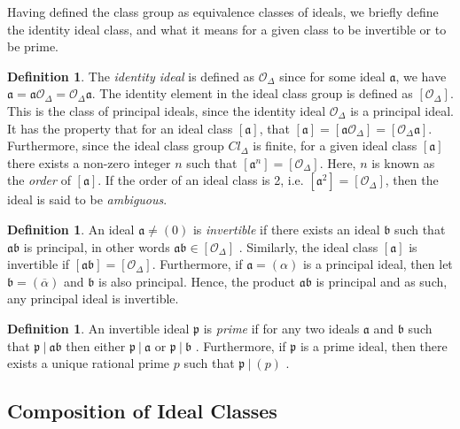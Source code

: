 \documentclass{ucalgthes1}
\theoremstyle{plain}
\theoremstyle{definition}
\newtheorem{defn}[thm]{Definition}
\newcommand{\OO}{\mathcal{O}}
\begin{document}
Having defined the class group as equivalence classes of ideals, we briefly define the identity ideal class, and what it means for a given class to be invertible or to be prime.

\begin{defn}
The \emph{identity ideal} is defined as $\OO_\Delta$ since for some ideal $\mathfrak a$, we have $\mathfrak a = \mathfrak a \OO_\Delta = \OO_\Delta \mathfrak a$.  The identity element in the ideal class group is defined as $[\OO_\Delta]$.  This is the class of principal ideals, since the identity ideal $\OO_\Delta$ is a principal ideal.  It has the property that for an ideal class $[\mathfrak a]$, that $[\mathfrak a] = [\mathfrak a \OO_\Delta] = [\OO_\Delta \mathfrak a]$. Furthermore, since the ideal class group $Cl_\Delta$ is finite, for a given ideal class $[\mathfrak a]$ there exists a non-zero integer $n$ such that $[{\mathfrak a}^n] = [\OO_\Delta]$.  Here, $n$ is known as the \emph{order} of $[\mathfrak a]$.  If the order of an ideal class is 2, i.e. $[\mathfrak a^2] = [\OO_\Delta]$, then the ideal is said to be \emph{ambiguous}.
\end{defn}


\begin{defn}
An ideal $\mathfrak a \neq (0)$ is \emph{invertible} if there exists an ideal $\mathfrak b$ such that $\mathfrak a \mathfrak b$ is principal, in other words $\mathfrak a \mathfrak b \in [\OO_\Delta]$ \cite[Definition 4.29]{Jac09}. Similarly, the ideal class $[\mathfrak a]$ is invertible if $[\mathfrak a \mathfrak b] = [\OO_\Delta]$.  Furthermore, if $\mathfrak a = (\alpha)$ is a principal ideal, then let $\mathfrak b = (\overline{\alpha})$ and $\mathfrak b$ is also principal.  Hence, the product $\mathfrak a \mathfrak b$ is principal and as such, any principal ideal is invertible.
\end{defn}

\begin{defn}
An invertible ideal $\mathfrak p$ is \emph{prime} if for any two ideals $\mathfrak a$ and $\mathfrak b$ such that $\mathfrak p ~|~ \mathfrak a \mathfrak b$ then either $\mathfrak p ~|~ \mathfrak a$ or $\mathfrak p ~|~ \mathfrak b$ \cite[Definition 4.40]{Jac09}.  Furthermore, if $\mathfrak p$ is a prime ideal, then there exists a unique rational prime $p$ such that $\mathfrak p ~|~ (p)$ \cite[Theorem 4.41]{Jac09}.
\end{defn}



\subsection{Composition of Ideal Classes}\label{subsec:idealCompose}
\end{document}
